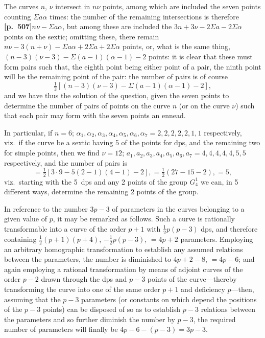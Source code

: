 \documentclass[11pt,a4paper]{article}
\begin{document}
The curves $n$, $\nu$ intersect in $n\nu$ points, among which are included the seven points counting $\Sigma a\alpha$ times: the number of the remaining intersections is therefore \noindent\textbf{[p.~507]}\quad $n\nu - \Sigma a\alpha$, but among these are included the $3n + 3\nu - 2\Sigma a - 2\Sigma\alpha$ points on the sextic; omitting these, there remain $n\nu - 3(n + \nu) - \Sigma a\alpha + 2\Sigma a + 2\Sigma\alpha$ points, or, what is the same thing, $(n - 3)(\nu - 3) - \Sigma(a - 1)(\alpha - 1) - 2$ points: it is clear that these must form pairs such that, the eighth point being either point of a pair, the ninth point will be the remaining point of the pair: the number of pairs is of course
\[
\tfrac{1}{2}[(n - 3)(\nu - 3) - \Sigma(a - 1)(\alpha - 1) - 2],
\]
and we have thus the solution of the question, given the seven points to determine the number of pairs of points on the curve $n$ (or on the curve $\nu$) such that each pair may form with the seven points an ennead.

In particular, if $n = 6$; $\alpha_{1}, \alpha_{2}, \alpha_{3}, \alpha_{4}, \alpha_{5}, \alpha_{6}, \alpha_{7} = 2, 2, 2, 2, 2, 1, 1$ respectively, viz.\ if the curve be a sextic having 5 of the points for dps, and the remaining two for simple points, then we find $\nu = 12$; $a_{1}, a_{2}, a_{3}, a_{4}, a_{5}, a_{6}, a_{7} = 4, 4, 4, 4, 4, 5, 5$ respectively, and the number of pairs is
\[
= \tfrac{1}{2}[3 \cdot 9 - 5(2 - 1)(4 - 1) - 2], = \tfrac{1}{2}(27 - 15 - 2), = 5,
\]
viz.\ starting with the 5~dps and any 2 points of the group $G_{4}^{1}$ we can, in 5 different ways, determine the remaining 2 points of the group.

In reference to the number $3p - 3$ of parameters in the curves belonging to a given value of $p$, it may be remarked as follows. Such a curve is rationally transformable into a curve of the order $p + 1$ with $\tfrac{1}{2}p(p - 3)$ dps, and therefore containing $\tfrac{1}{2}(p + 1)(p + 4)$, $- \tfrac{1}{2}p(p - 3)$, $= 4p + 2$ parameters. Employing an arbitrary homographic transformation to establish any assumed relations between the parameters, the number is diminished to $4p + 2 - 8$, $= 4p - 6$; and again employing a rational transformation by means of adjoint curves of the order $p - 2$ drawn through the dps and $p - 3$ points of the curve---thereby transforming the curve into one of the same order $p + 1$ and deficiency $p$---then, assuming that the $p - 3$ parameters (or constants on which depend the positions of the $p - 3$ points) can be disposed of so as to establish $p - 3$ relations between the parameters and so further diminish the number by $p - 3$, the required number of parameters will finally be $4p - 6 - (p - 3) = 3p - 3$.
\end{document}
